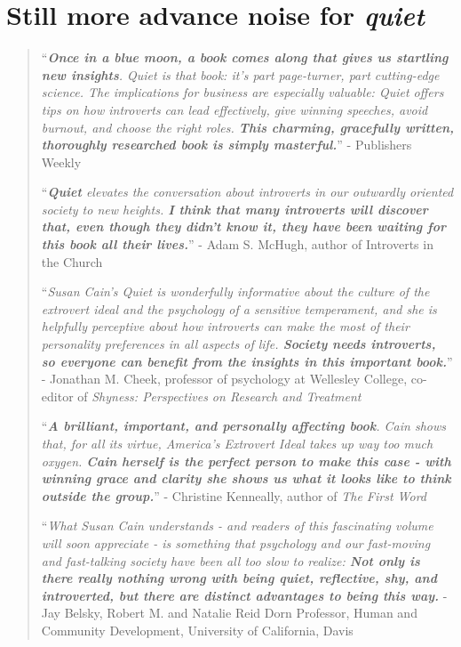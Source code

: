 \documentclass[oneside]{article}
\numberwithin{equation}{section}
\begin{document}
\section*{Still more advance noise for \textit{quiet}}
\begin{quotation}
    ``\textit{\textbf{Once in a blue moon, a book comes along that gives us startling new insights}. \emph{Quiet} is that book: it's part page-turner, part cutting-edge science. The implications for business are especially valuable: \emph{Quiet} offers tips on how introverts can lead effectively, give winning speeches, avoid burnout, and choose the right roles. \textbf{This charming, gracefully written, thoroughly researched book is simply masterful.}}'' - Publishers Weekly
    
    ``\textit{\textbf{Quiet} elevates the conversation about introverts in our outwardly oriented society to new heights. \textbf{I think that many introverts will discover that, even though they didn't know it, they have been waiting for this book all their lives.}}'' - Adam S. McHugh, author of Introverts in the Church
    
    ``\textit{Susan Cain's \emph{Quiet} is wonderfully informative about the culture of the extrovert ideal and the psychology of a sensitive temperament, and she is helpfully perceptive about how introverts can make the most of their personality preferences in all aspects of life. \textbf{Society needs introverts, so everyone can benefit from the insights in this important book.}}'' - Jonathan M. Cheek, professor of psychology at Wellesley College, co-editor of \textit{Shyness: Perspectives on Research and Treatment}
    
    ``\textit{\textbf{A brilliant, important, and personally affecting book}. Cain shows that, for all its virtue, America's Extrovert Ideal takes up way too much oxygen. \textbf{Cain herself is the perfect person to make this case - with winning grace and clarity she shows us what it looks like to think outside the group.}}'' - Christine Kenneally, author of \textit{The First Word}
    
    ``\textit{What Susan Cain understands - and readers of this fascinating volume will soon appreciate - is something that psychology and our fast-moving and fast-talking society have been all too slow to realize: \textbf{Not only is there really nothing wrong with being quiet, reflective, shy, and introverted, but there are distinct advantages to being this way.}} - Jay Belsky, Robert M. and Natalie Reid Dorn Professor, Human and Community Development, University of California, Davis
    

\end{quotation}
\end{document}
